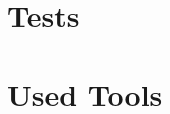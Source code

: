 \clearpage
{\section{Tests}}
\label{sect:tests}


\clearpage
{\section{Used Tools}}
\label{sect:tools}





